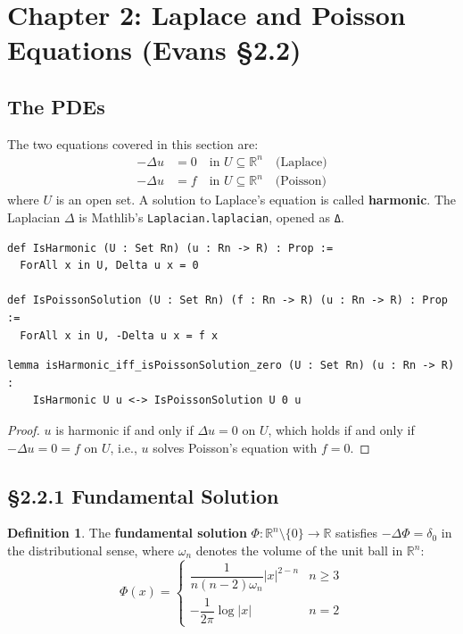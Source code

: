 ﻿\documentclass[12pt, a4paper]{article}
\renewcommand{\_}{\origunderscore\allowbreak}
\theoremstyle{definition}
\newtheorem{definition}{Definition}[section]
\theoremstyle{plain}
\begin{document}
\section{Chapter 2: Laplace and Poisson Equations (Evans §2.2)}

\subsection{The PDEs}

The two equations covered in this section are:
\begin{align}
  -\Delta u &= 0 \quad \text{in } U \subseteq \mathbb{R}^n \quad \text{(Laplace)} \\
  -\Delta u &= f \quad \text{in } U \subseteq \mathbb{R}^n \quad \text{(Poisson)}
\end{align}
where $U$ is an open set. A solution to Laplace's equation is called \textbf{harmonic}.
The Laplacian $\Delta$ is Mathlib's \texttt{Laplacian.laplacian}, opened as \texttt{Δ}.

\begin{lstlisting}[caption={PDE predicates}]
def IsHarmonic (U : Set Rn) (u : Rn -> R) : Prop :=
  ForAll x in U, Delta u x = 0

def IsPoissonSolution (U : Set Rn) (f : Rn -> R) (u : Rn -> R) : Prop :=
  ForAll x in U, -Delta u x = f x
\end{lstlisting}

\begin{lstlisting}[caption={Laplace is Poisson with f=0 (proved)}]
lemma isHarmonic_iff_isPoissonSolution_zero (U : Set Rn) (u : Rn -> R) :
    IsHarmonic U u <-> IsPoissonSolution U 0 u
\end{lstlisting}

\begin{proof}
$u$ is harmonic if and only if $\Delta u = 0$ on $U$, which holds if and only if
$-\Delta u = 0 = f$ on $U$, i.e., $u$ solves Poisson's equation with $f = 0$.
\end{proof}

\subsection{§2.2.1 Fundamental Solution}

\begin{definition}
The \textbf{fundamental solution} $\Phi : \mathbb{R}^n \setminus \{0\} \to \mathbb{R}$
satisfies $-\Delta \Phi = \delta_0$ in the distributional sense, where $\omega_n$
denotes the volume of the unit ball in $\mathbb{R}^n$:
\[
  \Phi(x) = \begin{cases}
    \dfrac{1}{n(n-2)\omega_n} |x|^{2-n} & n \geq 3 \\[6pt]
    -\dfrac{1}{2\pi} \log|x| & n = 2
  \end{cases}
\]
\end{definition}
\end{document}
